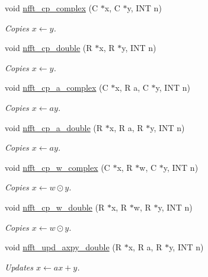 \begin{DoxyCompactItemize}
void \hyperlink{group__nfftutil_gae3b3665512df83e5872f8472ca20140a}{nfft\-\_\-cp\-\_\-complex} (C $\ast$x, C $\ast$y, I\-N\-T n)
\begin{DoxyCompactList}\small\item\em Copies $x \leftarrow y$. \end{DoxyCompactList}\item 
void \hyperlink{group__nfftutil_ga67c605dd3279d411dba44fb23d8bf558}{nfft\-\_\-cp\-\_\-double} (R $\ast$x, R $\ast$y, I\-N\-T n)
\begin{DoxyCompactList}\small\item\em Copies $x \leftarrow y$. \end{DoxyCompactList}\item 
void \hyperlink{group__nfftutil_gab2479a7efb636f28b9b956d22fcf3309}{nfft\-\_\-cp\-\_\-a\-\_\-complex} (C $\ast$x, R a, C $\ast$y, I\-N\-T n)
\begin{DoxyCompactList}\small\item\em Copies $x \leftarrow a y$. \end{DoxyCompactList}\item 
void \hyperlink{group__nfftutil_ga309919b444a3326ecc4da035803830d7}{nfft\-\_\-cp\-\_\-a\-\_\-double} (R $\ast$x, R a, R $\ast$y, I\-N\-T n)
\begin{DoxyCompactList}\small\item\em Copies $x \leftarrow a y$. \end{DoxyCompactList}\item 
void \hyperlink{group__nfftutil_ga0c722ce70d8678ad9c75f37b446a2684}{nfft\-\_\-cp\-\_\-w\-\_\-complex} (C $\ast$x, R $\ast$w, C $\ast$y, I\-N\-T n)
\begin{DoxyCompactList}\small\item\em Copies $x \leftarrow w\odot y$. \end{DoxyCompactList}\item 
void \hyperlink{group__nfftutil_gab5bafeb90780eba0342bc4ba3890cb08}{nfft\-\_\-cp\-\_\-w\-\_\-double} (R $\ast$x, R $\ast$w, R $\ast$y, I\-N\-T n)
\begin{DoxyCompactList}\small\item\em Copies $x \leftarrow w\odot y$. \end{DoxyCompactList}\item 
void \hyperlink{group__nfftutil_ga199963decfcccd0038f96eb236cf6b36}{nfft\-\_\-upd\-\_\-axpy\-\_\-double} (R $\ast$x, R a, R $\ast$y, I\-N\-T n)
\begin{DoxyCompactList}\small\item\em Updates $x \leftarrow a x + y$. \end{DoxyCompactList}\item 

\end{DoxyCompactItemize}

